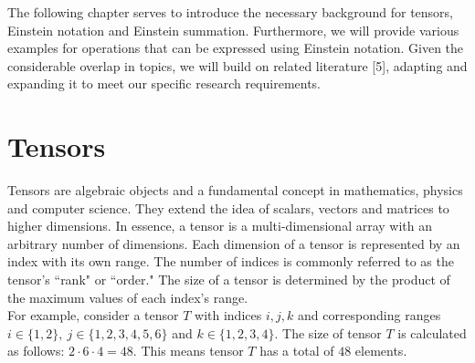 The following chapter serves to introduce the necessary background for tensors,
Einstein notation and Einstein summation. Furthermore, we will provide various 
examples for operations that can be expressed using Einstein notation. Given the 
considerable overlap in topics, we will build on related literature [5], adapting 
and expanding it to meet our specific research requirements.

\section{Tensors}
Tensors are algebraic objects and a fundamental concept in mathematics, physics
and computer science. They extend the idea of scalars, vectors and matrices to
higher dimensions. In essence, a tensor is a multi-dimensional array with an arbitrary
number of dimensions. Each dimension of a tensor is represented by an index with
its own range. The number of indices is commonly referred to as the tensor's ``rank"
or ``order." The size of a tensor is determined by the product of the maximum values
of each index's range.\\
For example, consider a tensor $T$ with indices $i,j,k$ and corresponding ranges
$i \in \{1,2\},\ j \in \{1,2,3,4,5,6\}$ and $k \in \{1,2,3,4\}$. The size of
tensor $T$ is calculated as follows: $2 \cdot 6 \cdot 4 = 48$. This means tensor
$T$ has a total of $48$ elements.

